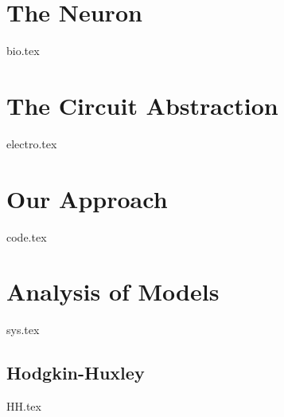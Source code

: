 
\chapter{The Neuron}\label{ch:neuron}
{bio.tex}

\chapter{The Circuit Abstraction}\label{ch:elemag}
{electro.tex}

\chapter{Our Approach}\label{ch:approa}
{code.tex}

\chapter{Analysis of Models}\label{ch:matmod}
{sys.tex}

\newpage
\section{Hodgkin-Huxley}
{HH.tex}







